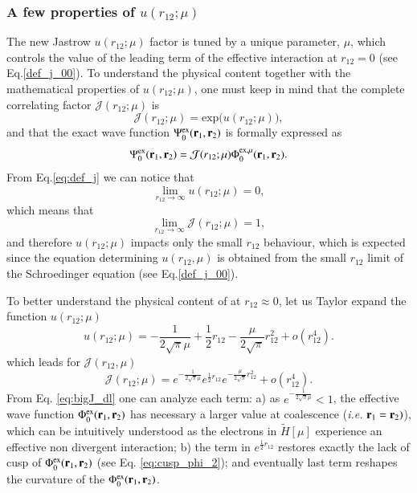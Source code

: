 \documentclass[aip,jcp,reprint,noshowkeys,superscriptaddress]{revtex4-1}
\newcommand{\br}[0]{{\bf {r}}}
\newcommand{\psiex}[0]{\Psi^{\text{ex}}_0}
\newcommand{\phiex}[0]{\Phi^{\text{ex}}_0}
\newcommand{\phimu}[0]{\Phi^{\text{ex},\mu}_0}
\begin{document}
\subsubsection{A few properties of $u(r_{12};\mu)$}
The new Jastrow $u(r_{12};\mu)$ factor is tuned by a unique parameter, $\mu$, which controls the value of the leading term of the effective interaction at $r_{12}=0$ (see Eq.\eqref{def_j_00}). 
To understand the physical content together with the mathematical properties of $u(r_{12};\mu)$, 
one must keep in mind that the complete correlating factor $\mathcal{J}(r_{12};\mu)$ is 
\begin{equation}
 \mathcal{J}(r_{12};\mu) = \text{exp}\big(u(r_{12};\mu)\big),
\end{equation}
and that the exact wave function $\psiex(\br{}_1,\br{}_2)$ is formally expressed as 
\begin{equation}
 \psiex(\br{}_1,\br{}_2) = \mathcal{J}(r_{12};\mu) \phimu(\br{}_{1},\br{}_{2}).  
\end{equation}
From Eq.\eqref{eq:def_j} we can notice that 
\begin{equation}
 \lim_{r_{12} \rightarrow \infty}u(r_{12};\mu) = 0,
\end{equation}
which means that 
\begin{equation}
 \lim_{r_{12} \rightarrow \infty}\mathcal{J}(r_{12};\mu) = 1,
\end{equation}
and therefore $u(r_{12};\mu)$ impacts only the small $r_{12}$ behaviour,  
which is expected since the equation determining $u(r_{12},\mu)$ is obtained from the small $r_{12}$ limit of the Schroedinger equation (see Eq.\eqref{def_j_00}). 

To better understand the physical content of at $r_{12}\approx 0$,  
let us Taylor expand the function $u(r_{12};\mu)$ 
\begin{equation}
 \label{eq:j_dl}
 u(r_{12};\mu) = -\frac{1}{2\sqrt{\pi}\mu} + \frac{1}{2}r_{12} - \frac{\mu}{2\sqrt{\pi}} r_{12}^2 + o(r_{12}^4).
\end{equation}
which leads for $\mathcal{J}(r_{12},\mu)$
\begin{equation}
 \label{eq:bigJ_dl}
 \mathcal{J}(r_{12};\mu) = e^{-\frac{1}{2\sqrt{\pi}\mu}} e^{ \frac{1}{2}r_{12}} e^{- \frac{\mu}{2\sqrt{\pi}} r_{12}^2} + o(r_{12}^4) .
\end{equation}
From Eq. \eqref{eq:bigJ_dl} one can analyze each term: a) as $e^{-\frac{1}{2\sqrt{\pi}\mu}}<1$, the effective wave function  $\phiex(\br{}_1,\br{}_2)$ has necessary a larger value at coalescence (\textit{i.e.} $\br{}_1=\br{}_2)$), which can be intuitively understood as the electrons in $\tilde{H}[\mu]$ experience an effective non divergent interaction; 
b) the term in $e^{ \frac{1}{2}r_{12}} $ restores exactly the lack of cusp of $\phiex(\br{}_1,\br{}_2)$ (see Eq. \eqref{eq:cusp_phi_2}); and eventually last term reshapes the curvature of the $\phiex(\br{}_1,\br{}_2)$. 
\end{document}
